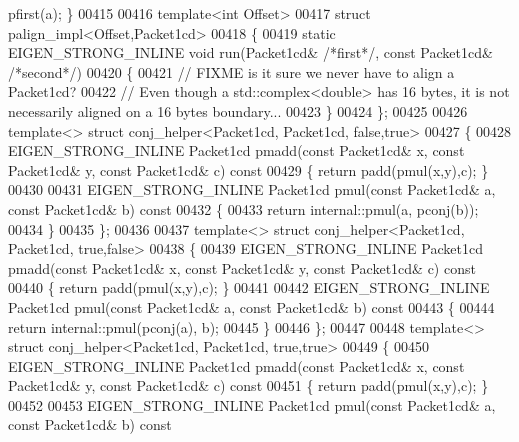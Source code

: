 \begin{DoxyCode}
      pfirst(a); \}
00415 
00416 \textcolor{keyword}{template}<\textcolor{keywordtype}{int} Offset>
00417 \textcolor{keyword}{struct }palign\_impl<Offset,Packet1cd>
00418 \{
00419   \textcolor{keyword}{static} EIGEN\_STRONG\_INLINE \textcolor{keywordtype}{void} run(Packet1cd& \textcolor{comment}{/*first*/}, \textcolor{keyword}{const} Packet1cd& \textcolor{comment}{/*second*/})
00420   \{
00421     \textcolor{comment}{// FIXME is it sure we never have to align a Packet1cd?}
00422     \textcolor{comment}{// Even though a std::complex<double> has 16 bytes, it is not necessarily aligned on a 16 bytes
       boundary...}
00423   \}
00424 \};
00425 
00426 \textcolor{keyword}{template}<> \textcolor{keyword}{struct }conj\_helper<Packet1cd, Packet1cd, false,true>
00427 \{
00428   EIGEN\_STRONG\_INLINE Packet1cd pmadd(\textcolor{keyword}{const} Packet1cd& x, \textcolor{keyword}{const} Packet1cd& y, \textcolor{keyword}{const} Packet1cd& c)\textcolor{keyword}{ const}
00429 \textcolor{keyword}{  }\{ \textcolor{keywordflow}{return} padd(pmul(x,y),c); \}
00430 
00431   EIGEN\_STRONG\_INLINE Packet1cd pmul(\textcolor{keyword}{const} Packet1cd& a, \textcolor{keyword}{const} Packet1cd& b)\textcolor{keyword}{ const}
00432 \textcolor{keyword}{  }\{
00433     \textcolor{keywordflow}{return} internal::pmul(a, pconj(b));
00434   \}
00435 \};
00436 
00437 \textcolor{keyword}{template}<> \textcolor{keyword}{struct }conj\_helper<Packet1cd, Packet1cd, true,false>
00438 \{
00439   EIGEN\_STRONG\_INLINE Packet1cd pmadd(\textcolor{keyword}{const} Packet1cd& x, \textcolor{keyword}{const} Packet1cd& y, \textcolor{keyword}{const} Packet1cd& c)\textcolor{keyword}{ const}
00440 \textcolor{keyword}{  }\{ \textcolor{keywordflow}{return} padd(pmul(x,y),c); \}
00441 
00442   EIGEN\_STRONG\_INLINE Packet1cd pmul(\textcolor{keyword}{const} Packet1cd& a, \textcolor{keyword}{const} Packet1cd& b)\textcolor{keyword}{ const}
00443 \textcolor{keyword}{  }\{
00444     \textcolor{keywordflow}{return} internal::pmul(pconj(a), b);
00445   \}
00446 \};
00447 
00448 \textcolor{keyword}{template}<> \textcolor{keyword}{struct }conj\_helper<Packet1cd, Packet1cd, true,true>
00449 \{
00450   EIGEN\_STRONG\_INLINE Packet1cd pmadd(\textcolor{keyword}{const} Packet1cd& x, \textcolor{keyword}{const} Packet1cd& y, \textcolor{keyword}{const} Packet1cd& c)\textcolor{keyword}{ const}
00451 \textcolor{keyword}{  }\{ \textcolor{keywordflow}{return} padd(pmul(x,y),c); \}
00452 
00453   EIGEN\_STRONG\_INLINE Packet1cd pmul(\textcolor{keyword}{const} Packet1cd& a, \textcolor{keyword}{const} Packet1cd& b)\textcolor{keyword}{ const}

\end{DoxyCode}

